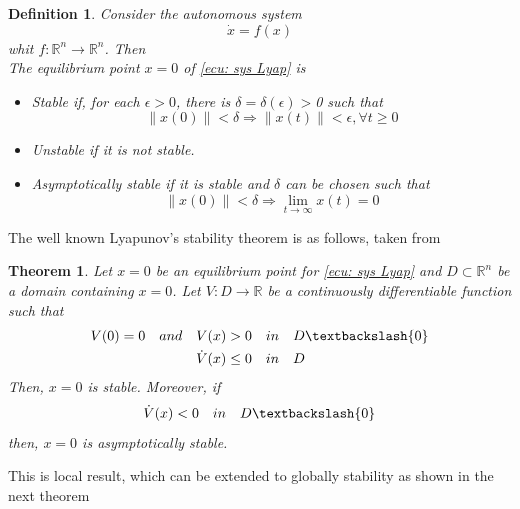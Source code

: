 \documentclass[11pt,letterpaper,twoside,openright]{report}
\newcommand{\RE}{\mathbb{R}}
\providecommand{\norm}[1]{\lVert#1\rVert}
\newtheorem{theorem}{Theorem}[chapter]
\newtheorem{definition}{Definition}[chapter]
\begin{document}
\begin{definition}
	Consider the autonomous system 
	\begin{equation}\label{ecu: sys Lyap}
		\dot{x}=f(x)
	\end{equation}
	whit $f: \RE^n \rightarrow \RE^n$. Then \\
	The equilibrium point $x=0$ of \eqref{ecu: sys Lyap} is 
	\begin{itemize}
		\item Stable if, for each $\epsilon>0$, there is $\delta=\delta(\epsilon)>$0 such that 
		\begin{equation}
			\norm{x(0)} < \delta \Rightarrow \norm{x(t)}<\epsilon, \forall t\geq 0
		\end{equation}
		\item Unstable if it is not stable.
		\item Asymptotically stable if it is stable  and $\delta$ can be chosen such that
		\begin{equation}
			\norm{x(0)} < \delta \Rightarrow \lim_{t\to \infty} x(t)=0
		\end{equation}
	\end{itemize}
\end{definition}

The well known Lyapunov's stability theorem is as follows, taken from \cite{Khalil2003}

\begin{theorem}
	Let $x=0$ be an equilibrium point for \eqref{ecu: sys Lyap} and $D\subset \RE^n$ be a domain containing $x=0$. Let $V: D\rightarrow \RE$ be a continuously differentiable function such that
	\begin{equation}
		\begin{split}
		V(0) = 0 \quad and \quad V(x) &> 0 \quad in \quad D \textbackslash \{0 \} \\
		\dot{V}(x) &\leq 0 \quad in \quad D
		\end{split}
	\end{equation}
	Then, $x=0$ is stable. Moreover, if 
	\begin{equation}
		\dot{V}(x) < 0 \quad in \quad D \textbackslash \{0 \}
	\end{equation}
	then, $x=0$ is asymptotically stable.
\end{theorem}

This is local result, which can be extended to globally stability as shown in the next theorem
\end{document}
